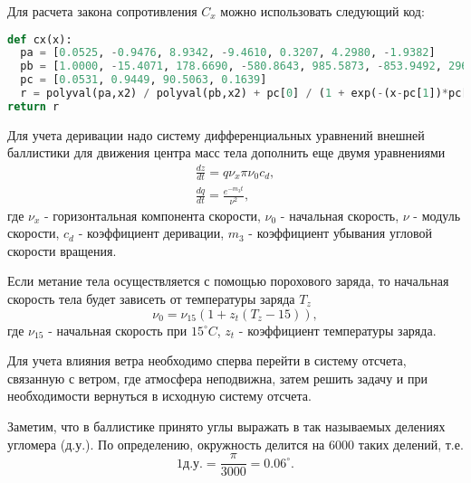 \documentclass{report}
\begin{document}
Для расчета закона сопротивления $C_x$ можно использовать следующий код:
\begin{lstlisting}[language=Python, basicstyle=\small]
def cx(x):
  pa = [0.0525, -0.9476, 8.9342, -9.4610, 0.3207, 4.2980, -1.9382]
  pb = [1.0000, -15.4071, 178.6690, -580.8643, 985.5873, -853.9492, 296.9213]
  pc = [0.0531, 0.9449, 90.5063, 0.1639]
  r = polyval(pa,x2) / polyval(pb,x2) + pc[0] / (1 + exp(-(x-pc[1])*pc[2])) + pc[3]
return r
\end{lstlisting}
Для учета деривации надо систему дифференциальных уравнений внешней баллистики для движения центра масс тела дополнить еще двумя уравнениями
\begin{equation} \label{c13eq7}
	\begin{split}
		\frac{dz}{dt} = q \nu_x \pi \nu_0 c_d, \\
		\frac{dq}{dt} = \frac{e^{-m_3 t}}{\nu^2}, 
	\end{split}
\end{equation}
где $\nu_x$ - горизонтальная компонента скорости, $\nu_0$ - начальная скорость, $\nu$ - модуль скорости, $c_d$ - коэффициент деривации, $m_3$ - коэффициент убывания угловой скорости вращения.

Если метание тела осуществляется с помощью порохового заряда, то начальная скорость тела будет зависеть от температуры заряда $T_z$
\begin{equation} \label{c13eq8}
	\nu_0 = \nu_{15} \left( 1 + z_t \left( T_z - 15 \right) \right),
\end{equation}
где $\nu_{15}$ - начальная скорость при $15^\circ C$, $z_t$ - коэффициент температуры заряда.

Для учета влияния ветра необходимо сперва перейти в систему отсчета, связанную с ветром, где атмосфера неподвижна, затем решить задачу и при необходимости вернуться в исходную систему отсчета.

Заметим, что в баллистике принято углы выражать в так называемых делениях угломера (д.у.). По определению, окружность делится на 6000 таких делений, т.е.
\begin{equation} \label{c13eq9}
	1 \textit{д.у.} = \frac{\pi}{3000} = 0.06^\circ.
\end{equation}
\end{document}

